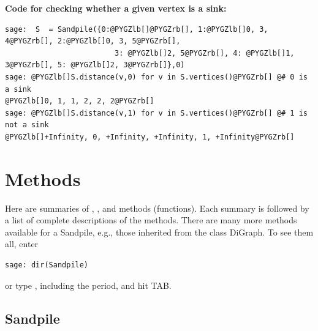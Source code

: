 \documentclass[letterpaper,10pt,english]{manual}
\begin{document}
\textbf{Code for checking whether a given vertex is a sink:}

\begin{Verbatim}[commandchars=@\[\]]
sage:  S  = Sandpile({0:@PYGZlb[]@PYGZrb[], 1:@PYGZlb[]0, 3, 4@PYGZrb[], 2:@PYGZlb[]0, 3, 5@PYGZrb[],
                         3: @PYGZlb[]2, 5@PYGZrb[], 4: @PYGZlb[]1, 3@PYGZrb[], 5: @PYGZlb[]2, 3@PYGZrb[]},0)
sage: @PYGZlb[]S.distance(v,0) for v in S.vertices()@PYGZrb[] @# 0 is a sink
@PYGZlb[]0, 1, 1, 2, 2, 2@PYGZrb[]
sage: @PYGZlb[]S.distance(v,1) for v in S.vertices()@PYGZrb[] @# 1 is not a sink
@PYGZlb[]+Infinity, 0, +Infinity, +Infinity, 1, +Infinity@PYGZrb[]
\end{Verbatim}


\section{Methods}

Here are summaries of , , and  methods
(functions).  Each summary is followed by a list of complete descriptions of
the methods.  There are many more methods available for a Sandpile, e.g.,
those inherited from the class DiGraph.  To see them all, enter

\begin{Verbatim}[commandchars=@\[\]]
sage: dir(Sandpile)
\end{Verbatim}

or type , including the period, and hit TAB.


\subsection{Sandpile}
\end{document}
